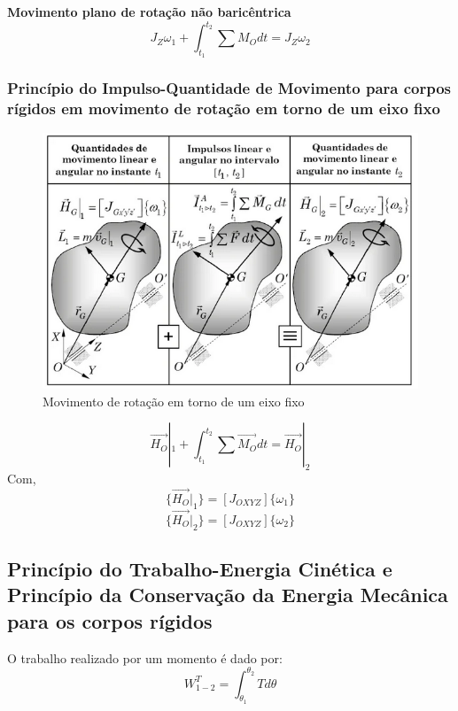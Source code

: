 \documentclass[a4paper, 12pt]{article}
\begin{document}
		\textbf{Movimento plano de rotação não baricêntrica}\\
		\begin{equation}
			J_Z\omega_1 + \int^{t_2}_{t_1} \sum M_Odt = J_Z \omega_2
		\end{equation}

		\newpage
		\subsubsection{Princípio do Impulso-Quantidade de Movimento para corpos rígidos em movimento de rotação em torno de um eixo fixo}
		\begin{figure}[h]
			\center
			\includegraphics[scale=0.7]{imagens/b1.png} 
			\caption{Movimento de rotação em torno de um eixo fixo}
		\end{figure}
		\begin{equation}
			\vec{H_O}|_1 + \int^{t_2}_{t_1} \sum \vec{M_O} dt = \vec{H_O}|_2
		\end{equation}	
		Com,
		\begin{equation}
			\{\vec{H_O}|_1\} = [J_{OXYZ}]\{\omega_1\}
		\end{equation}
		\begin{equation}
			\{\vec{H_O}|_2\} = [J_{OXYZ}]\{\omega_2\}
		\end{equation}

		
	\subsection{Princípio do Trabalho-Energia Cinética e Princípio da Conservação da Energia Mecânica para os corpos rígidos}
	O trabalho realizado por um momento é dado por:
	\begin{equation}
		W_{1-2}^T = \int^{\theta_2}_{\theta_1} T d\theta
	\end{equation}
\end{document}

